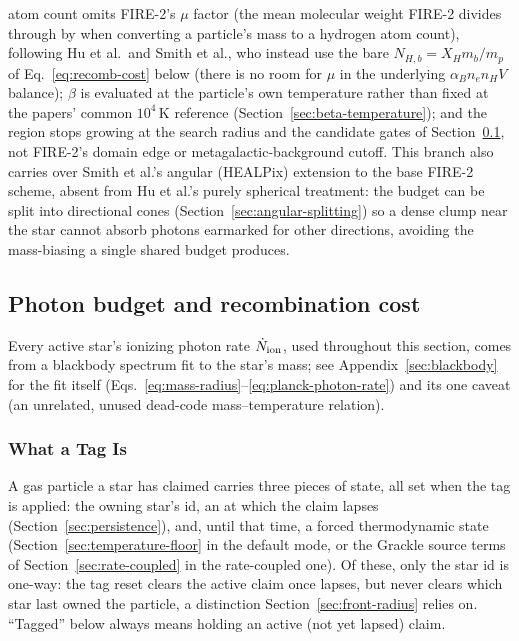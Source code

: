 atom count omits FIRE-2's $\mu$ factor (the mean molecular weight FIRE-2
divides through by when converting a particle's mass to a hydrogen
atom count), following Hu et al.\ and Smith et al., who instead use the
bare $N_{H,b}=X_H m_b/m_p$ of Eq.~\ref{eq:recomb-cost} below (there is
no room for $\mu$ in the underlying $\alpha_B n_e n_H
V$ balance); $\beta$ is evaluated at the particle's own temperature
rather than fixed at the papers' common $10^4\,$K reference
(Section~\ref{sec:beta-temperature}); and the region stops growing at
the search radius and the candidate gates of
Section~\ref{sec:photon-budget}, not FIRE-2's domain edge or
metagalactic-background cutoff. This branch also carries over Smith et
al.'s angular (HEALPix) extension to the base FIRE-2 scheme, absent
from Hu et al.'s purely spherical treatment: the budget can be split
into directional cones (Section~\ref{sec:angular-splitting}) so a
dense clump near the star cannot absorb photons earmarked for other
directions, avoiding the mass-biasing a single shared budget produces.

\subsection{Photon budget and recombination cost}
\label{sec:photon-budget}

Every active star's ionizing photon rate $\dot N_{\rm ion}$, used
throughout this section, comes from a blackbody spectrum fit to the
star's mass; see Appendix~\ref{sec:blackbody} for the fit itself
(Eqs.~\ref{eq:mass-radius}--\ref{eq:planck-photon-rate}) and its one
caveat (an unrelated, unused dead-code mass--temperature relation).

\subsubsection{What a Tag Is}

A gas particle a star has claimed carries three
pieces of state, all set when the tag is applied:
the owning star's id, an  at which the claim lapses
(Section~\ref{sec:persistence}), and, until that time, a forced
thermodynamic state (Section~\ref{sec:temperature-floor} in the
default mode, or the Grackle source terms of
Section~\ref{sec:rate-coupled} in the rate-coupled one). Of these,
only the star id is one-way: the tag reset clears the active claim once  lapses, but never
clears which star last owned the particle, a distinction
Section~\ref{sec:front-radius} relies on. ``Tagged'' below always
means holding an active (not yet lapsed) claim.

